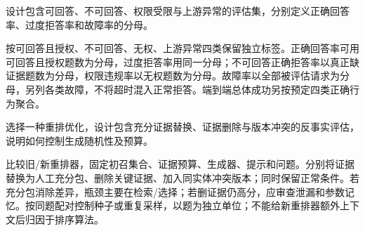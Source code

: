 \begin{exercises}
\begin{exercise} 设计包含可回答、不可回答、权限受限与上游异常的评估集，分别定义正确回答率、过度拒答率和故障率的分母。

\begin{solution}
按可回答且授权、不可回答、无权、上游异常四类保留独立标签。正确回答率可用可回答且授权题数为分母，过度拒答率用同一分母；不可回答正确拒答率以真正缺证据题数为分母，权限违规率以无权题数为分母。故障率以全部被评估请求为分母，另列各类故障，不将超时混入正常拒答。端到端总体成功另按预定四类正确行为聚合。
\end{solution}
\end{exercise}

\begin{exercise} 选择一种重排优化，设计包含充分证据替换、证据删除与版本冲突的反事实评估，说明如何控制生成随机性及预算。

\begin{solution}
比较旧/新重排器，固定初召集合、证据预算、生成器、提示和问题。分别将证据替换为人工充分包、删除关键证据、加入同实体冲突版本；同时保留正常条件。若充分包消除差异，瓶颈主要在检索/选择；若删证据仍高分，应审查泄漏和参数记忆。按同题配对控制种子或重复采样，以题为独立单位；不能给新重排器额外上下文后归因于排序算法。
\end{solution}
\end{exercise}

\end{exercises}
